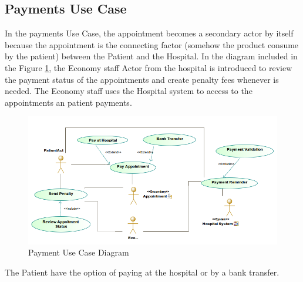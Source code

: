 \documentclass{article}
\begin{document}
            \subsection{Payments Use Case}

            In the payments Use Case, the appointment becomes a secondary actor by itself because the appointment is the connecting factor (somehow the product consume by the patient) between the Patient and the
            Hospital. In the diagram included in the Figure  \ref{fig:payment}, the Economy staff Actor from the hospital is introduced to review the payment status of the appointments and create penalty fees whenever is needed.
            The Economy staff uses the Hospital system to access to the appointments an patient payments.

            \begin{figure}[H]
                \centering 
                \includegraphics[width=1\linewidth]{./img/payments.png}
                \caption{Payment Use Case Diagram}
                \label{fig:payment}
            \end{figure}

            The Patient have the option of paying at the hospital or by a bank transfer.
            
\end{document}
